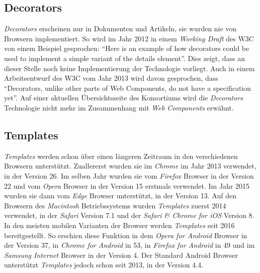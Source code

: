 \documentclass[12pt, paper=a4, bibtotoc, toc=listof, headsepline=true]{scrreprt}
\begin{document}
		\subsection{Decorators}
		\emph{Decorators} erscheinen nur in Dokumenten und Artikeln, sie wurden nie von Browsern implementiert. So wird im Jahr 2012 in einem \emph{Working Draft} des \ac{W3C} von einem Beispiel gesprochen: \enquote{Here is an example of how decorators could be used to implement a simple variant of the details element}\cite{Cooney2012}. Dies zeigt, dass an dieser Stelle noch keine Implementierung der Technologie vorliegt. Auch in einem Arbeitsentwurf des \ac{W3C} vom Jahr 2013 wird davon gesprochen, dass \enquote{Decorators, unlike other parts of Web Components, do not have a specification yet}\cite{Cooney2013}.
		Auf einer aktuellen Übersichtsseite des Konsortiums wird die \emph{Decorators} Technologie nicht mehr im Zusammenhang mit \emph{Web Components} erwähnt\cite{WebComCur2016}.
		\subsection{Templates}
		\emph{Templates} werden schon über einen längeren Zeitraum in den verschiedenen Browsern unterstützt. Zuallererst wurden sie im \emph{Chrome} im Jahr 2013 verwendet, in der Version 26. Im selben Jahr wurden sie vom \emph{Firefox} Browser in der Version 22 und vom \emph{Opera} Browser in der Version 15 erstmals verwendet\cite{W2015}\cite{htmlTemFire}.
		Im Jahr 2015 wurden sie dann vom \emph{Edge} Browser unterstützt, in der Version 13\cite{build10547}.
		Auf den Browsern des \emph{Macintosh} Betriebssystems wurden \emph{Templates} zuerst 2014 verwendet, in der \emph{Safari} Version 7.1 und der \emph{Safari \& Chrome for iOS} Version 8\cite{htmlTemplCaniuse}. In den meisten mobilen Varianten der Browser werden \emph{Templates} seit 2016 bereitgestellt. So erschien diese Funktion in dem \emph{Opera for Android} Browser in der Version 37, in \emph{Chrome for Android} in 53, in \emph{Firefox for Android} in 49 und im \emph{Samsung Internet} Browser in der Version 4. Der Standard Android Browser unterstützt \emph{Templates} jedoch schon seit 2013, in der Version 4.4\cite{htmlTemplCaniuse}.
\end{document}
